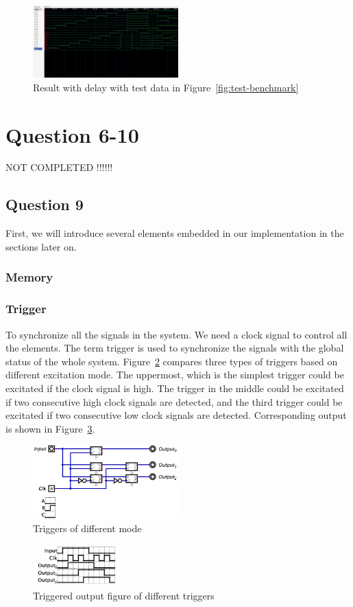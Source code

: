 \documentclass[conference]{IEEEtran}
\begin{document}
\begin{figure}[h!]
    \centering
    \includegraphics[width=0.5\textwidth]{assets/gtkwave.png}
    \caption{Result with delay with test data in Figure~\ref{fig:test-benchmark}}
    \label{fig:result-with-delay}
\end{figure}

\section{Question 6-10}

NOT COMPLETED !!!!!!

\subsection{Question 9}

First, we will introduce several elements embedded in our implementation in the sections later on.

\subsubsection{Memory}

\subsubsection{Trigger}

To synchronize all the signals in the system. We need a clock signal to control all the elements. The term trigger is used to synchronize the signals
with the global status of the whole system. Figure~\ref{fig:triggers} compares three types of triggers based on different excitation mode. The uppermost, which is the simplest trigger could be excitated if
the clock signal is high. The trigger in the middle could be excitated if two consecutive high clock signals are detected, and the third trigger could be excitated if two consecutive low clock signals are detected. Corresponding output is shown in Figure~\ref{fig:trigger-output}.

\begin{figure}[h!]
    \centering
    \includegraphics[width=0.5\textwidth]{assets/triggers.png}
    \caption{Triggers of different mode}
    \label{fig:triggers}
\end{figure}

\begin{figure}[h!]
    \centering
    \includegraphics[width=0.3\textwidth]{assets/trigger-output.png}
    \caption{Triggered output figure of different triggers}
    \label{fig:trigger-output}
\end{figure}
\end{document}
